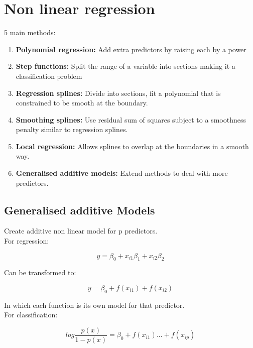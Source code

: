 \documentclass[11pt]{scrartcl} %
\begin{document}
\section{Non linear regression}

5 main methods:

\begin{enumerate}
	\item \textbf{Polynomial regression:} Add extra predictors by raising each by a power
	\item \textbf{Step functions:} Split the range of a variable into sections making it a classification problem
	\item \textbf{Regression splines:} Divide into sections, fit a polynomial that is constrained to be smooth
	at the boundary.
	\item \textbf{Smoothing splines:} Use residual sum of squares subject to a smoothness penalty similar to regression splines.
	\item \textbf{Local regression:} Allows splines to overlap at the boundaries in a smooth way.
	\item \textbf{Generalised additive models:} Extend methods to deal with more predictors.
\end{enumerate}

\subsection{Generalised additive Models}

Create additive non linear model for p predictors.\\

For regression:

\begin{equation}
	y = \beta_0 + x_{i1}\beta_1 + x_{i2}\beta_2
\end{equation}

Can be transformed to:

\begin{equation}
	y = \beta_0 + f(x_{i1}) + f(x_{i2})
\end{equation}

In which each function is its own model for that predictor.\\

For classification:

\begin{equation}
	log\frac{p(x)}{1-p(x)} = \beta_0 + f(x_{i1}) ... + f(x_{ip})
\end{equation}
\end{document}

